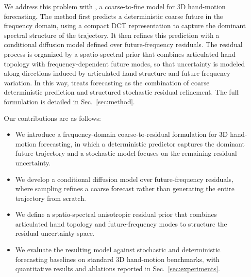We address this problem with \modelname{}, a coarse-to-fine model for 3D hand-motion forecasting. The method first predicts a deterministic coarse future in the frequency domain, using a compact DCT representation to capture the dominant spectral structure of the trajectory. It then refines this prediction with a conditional diffusion model defined over future-frequency residuals. The residual process is organized by a spatio-spectral prior that combines articulated hand topology with frequency-dependent future modes, so that uncertainty is modeled along directions induced by articulated hand structure and future-frequency variation. In this way, \modelname{} treats forecasting as the combination of coarse deterministic prediction and structured stochastic residual refinement. The full formulation is detailed in Sec.~\ref{sec:method}.

Our contributions are as follows:
\begin{itemize}
    \item We introduce a frequency-domain coarse-to-residual formulation for 3D hand-motion forecasting, in which a deterministic predictor captures the dominant future trajectory and a stochastic model focuses on the remaining residual uncertainty.
    \item We develop a conditional diffusion model over future-frequency residuals, where sampling refines a coarse forecast rather than generating the entire trajectory from scratch.
    \item We define a spatio-spectral anisotropic residual prior that combines articulated hand topology and future-frequency modes to structure the residual uncertainty space.
    \item We evaluate the resulting model against stochastic and deterministic forecasting baselines on standard 3D hand-motion benchmarks, with quantitative results and ablations reported in Sec.~\ref{sec:experiments}.
\end{itemize}
